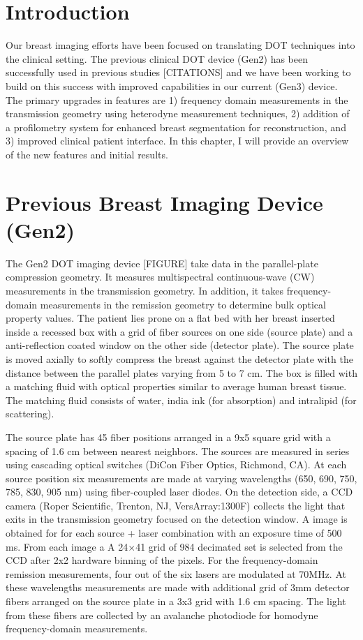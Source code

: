 \section{Introduction}
Our breast imaging efforts have been focused on translating DOT techniques into the clinical setting. The previous clinical DOT device (Gen2)  has been successfully used in previous studies [CITATIONS] and we have been working to build on this success with improved capabilities in our current (Gen3) device. The primary upgrades in features are 1) frequency domain measurements in the transmission geometry using heterodyne measurement techniques, 2) addition of a profilometry system for enhanced breast segmentation for reconstruction, and 3) improved clinical patient interface. In this chapter, I will provide an overview of the new features and initial results.

\section{Previous Breast Imaging Device (Gen2)}
The Gen2 DOT imaging device [FIGURE] take data in the parallel-plate compression geometry. It measures multispectral continuous-wave (CW) measurements in the transmission geometry. In addition, it takes frequency-domain measurements in the remission geometry to determine bulk optical property values. The patient lies prone on a flat bed with her breast inserted inside a recessed box with a grid of fiber sources on one side (source plate) and a anti-reflection coated window on the other side (detector plate). The source plate is moved axially to softly compress the breast against the detector plate with the distance between the parallel plates varying from 5 to 7 cm. The box is filled with a matching fluid with optical properties similar to average human breast tissue. The matching fluid consists of water, india ink (for absorption) and intralipid (for scattering).

The source plate has 45 fiber positions arranged in a 9x5 square grid with a spacing of 1.6 cm between nearest neighbors. The sources are measured in series using cascading optical switches (DiCon Fiber Optics, Richmond, CA). At each source position six measurements are made at varying wavelengths (650, 690, 750, 785, 830, 905 nm) using fiber-coupled laser diodes. On the detection side, a CCD camera (Roper Scientific, Trenton, NJ, VersArray:1300F) collects the light that exits in the transmission geometry focused on the detection window. A image is obtained for for each source + laser combination with an exposure time of 500 ms. From each image a  A 24$\times$41 grid of 984  decimated set is selected from the CCD after 2x2 hardware binning of the pixels. For the frequency-domain remission measurements, four out of the six lasers are modulated at 70MHz. At these wavelengths measurements are made with additional grid of 3mm detector fibers arranged on the source plate in a 3x3 grid with 1.6 cm spacing. The light from these fibers are collected by an avalanche photodiode for homodyne frequency-domain measurements.

